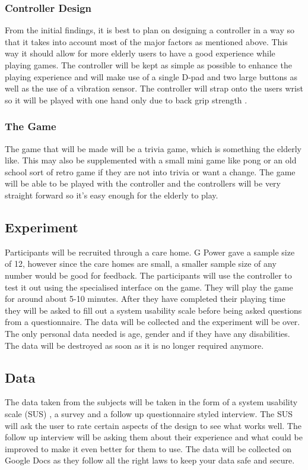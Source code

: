 \documentclass[journal]{IEEEtran}
\begin{document}
\subsubsection{Controller Design}
From the initial findings, it is best to plan on designing a controller in a way so that it takes into account most of the major factors as mentioned above. This way it should allow for more elderly users to have a good experience while playing games. The controller will be kept as simple as possible to enhance the playing experience and will make use of a single D-pad and two large buttons as well as the use of a vibration sensor. The controller will strap onto the users wrist so it will be played with one hand only due to back grip strength \cite{ijsselsteijn_digital_2007}.

\subsubsection{The Game}
The game that will be made will be a trivia game, which is something the elderly like. This may also be supplemented with a small mini game like pong or an old school sort of retro game if they are not into trivia or want a change. The game will be able to be played with the controller and the controllers will be very straight forward so it's easy enough for the elderly to play.

\subsection{Experiment}
Participants will be recruited through a care home. G Power \cite{noauthor_universitat_nodate} gave a sample size of 12, however since the care homes are small, a smaller sample size of any number would be good for feedback. The participants will use the controller to test it out using the specialised interface on the game. They will play the game for around about 5-10 minutes. After they have completed their playing time they will be asked to fill out a system usability scale before being asked questions from a questionnaire. The data will be collected and the experiment will be over. The only personal data needed is age, gender and if they have any disabilities. The data will be destroyed as soon as it is no longer required anymore. 

\subsection{Data}
The data taken from the subjects will be taken in the form of a system usability scale (SUS) \cite{affairs_system_2013}, a survey and a follow up questionnaire styled interview. The SUS will ask the user to rate certain aspects of the design to see what works well. The follow up interview will be asking them about their experience and what could be improved to make it even better for them to use. The data will be collected on Google Docs as they follow all the right laws to keep your data safe and secure.
\end{document}
